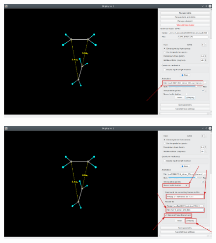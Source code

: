 \documentclass[a4paper,10pt]{article}
\begin{document}
\begin{minipage}{.5\linewidth}
\begin{figure}[H]
\caption{\label{fig:59}}
\begin{center}
\includegraphics[width=0.95\linewidth]{damqt_QS_fig59_b.png}
\end{center}
\end{figure} 
\end{minipage}
\begin{minipage}{.5\linewidth}
\begin{figure}[H]
\caption{\label{fig:60}}
\begin{center}
\includegraphics[width=0.95\linewidth]{damqt_QS_fig60_b.png}
\end{center}
\end{figure} 
\end{minipage}

\end{document}
